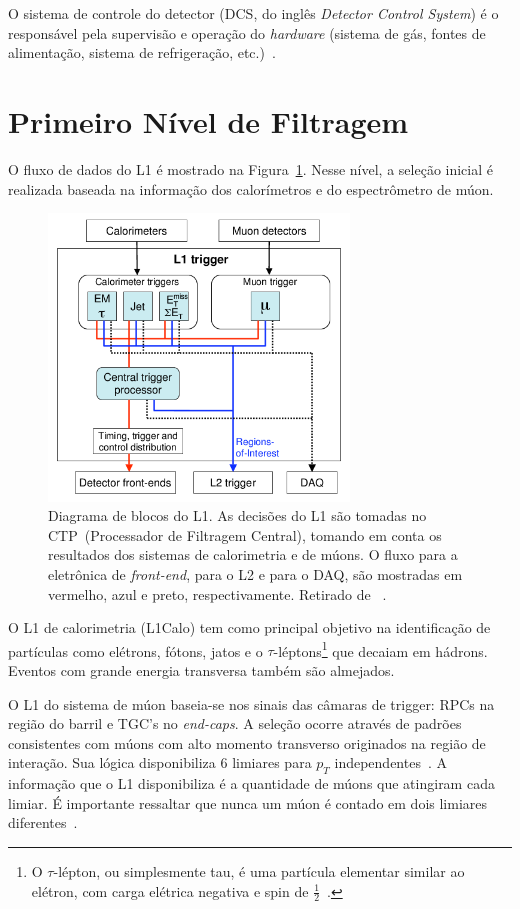 O sistema de controle do detector (DCS,  do inglês \emph{Detector Control
System}) é o responsável pela supervisão e operação do \emph{hardware} (sistema
de gás, fontes de alimentação, sistema de refrigeração, etc.)~\cite{PPOY2008}.

\section{Primeiro Nível de Filtragem}

O fluxo de dados do L1 é mostrado na Figura~\ref{fig:l1schema}. Nesse nível, a
seleção inicial é realizada baseada na informação dos calorímetros e do
espectrômetro de múon.

\begin{figure}[htpb!]
    \centering
    \includegraphics[width=8cm]{images/l1-schema.png}
    \caption[Diagrama de blocos do L1.]{Diagrama de blocos do L1. As decisões do L1 são tomadas no
    CTP~(Processador de Filtragem Central), tomando em conta os resultados dos
    sistemas de calorimetria e de múons. O fluxo para a eletrônica de
    \emph{front-end}, para o L2 e para o DAQ, são mostradas em vermelho, azul e
    preto, respectivamente. Retirado de ~\cite{ATLAS2008}.}
    \label{fig:l1schema}
\end{figure}

O L1 de calorimetria (L1Calo) tem como principal objetivo na identificação de
partículas como elétrons, fótons, jatos e o $\tau$-léptons\footnote{O
$\tau$-lépton, ou simplesmente tau, é uma partícula elementar similar ao
elétron, com carga elétrica negativa e spin de
$\frac{1}{2}$~\cite{ATLAS2011TAU}.} que decaiam em hádrons. Eventos com grande
energia transversa também são almejados. 

O L1 do sistema de múon baseia-se nos sinais das câmaras de trigger: RPCs na
região do barril e TGC's no \emph{end-caps}. A seleção ocorre através de
padrões consistentes com múons com alto momento transverso originados na região
de interação. Sua lógica disponibiliza 6 limiares para $p_T$
independentes~\cite{ATLAS2008}. A informação que o L1 disponibiliza é a
quantidade de múons que atingiram cada limiar. É importante ressaltar que nunca
um múon é contado em dois limiares diferentes~\cite{ATLAS2008}.


